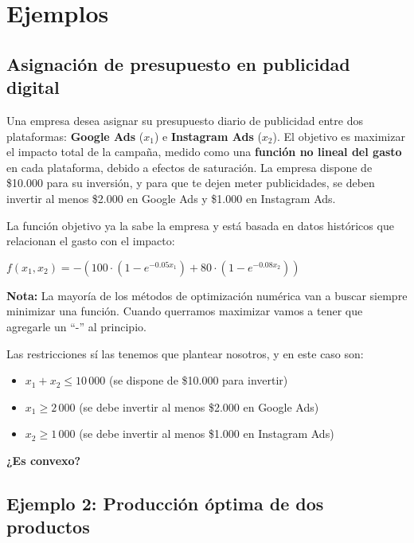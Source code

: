 \documentclass[12pt]{article}
\begin{document}
\section{Ejemplos}

\subsection{Asignación de presupuesto en publicidad digital}

Una empresa desea asignar su presupuesto diario de publicidad entre dos plataformas: \textbf{Google Ads} ($x_1$) e \textbf{Instagram Ads} ($x_2$). El objetivo es maximizar el impacto total de la campaña, medido como una \textbf{función no lineal del gasto} en cada plataforma, debido a efectos de saturación. La empresa dispone de \$10.000 para su inversión, y para que te dejen meter publicidades, se deben invertir al menos \$2.000 en Google Ads y \$1.000 en Instagram Ads.

\vspace{1em}

La función objetivo ya la sabe la empresa y está basada en datos históricos que relacionan el gasto con el impacto:

\begin{center}
$\displaystyle f(x_1, x_2) = - \left( 100 \cdot \left(1 - e^{-0.05 x_1}\right) + 80 \cdot \left(1 - e^{-0.08 x_2}\right) \right)$
\end{center}

\textbf{Nota:} La mayoría de los métodos de optimización numérica van a buscar siempre minimizar una función. Cuando querramos maximizar vamos a tener que agregarle un ``-'' al principio.

\vspace{1em}

Las restricciones sí las tenemos que plantear nosotros, y en este caso son:
\begin{itemize}
    \item $x_1 + x_2 \leq 10\,000$ (se dispone de \$10.000 para invertir)
    \item $x_1 \geq 2\,000$ (se debe invertir al menos \$2.000 en Google Ads)
    \item $x_2 \geq 1\,000$ (se debe invertir al menos \$1.000 en Instagram Ads)
\end{itemize}

\textbf{¿Es convexo?}

\vspace{1em}

\subsection{Ejemplo 2: Producción óptima de dos productos}
\end{document}
